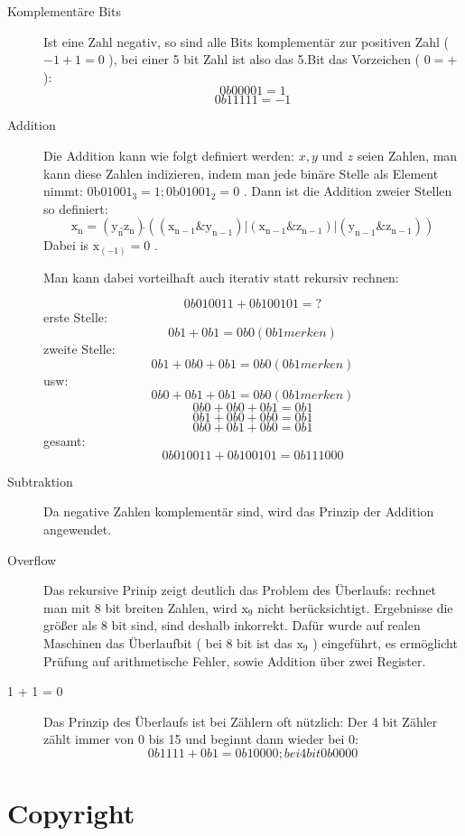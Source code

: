 \documentclass[a4paper,12pt,oneside]{scrreprt}
\begin{document}
\begin{description}

\item[Komplementäre Bits] Ist eine Zahl negativ, so sind alle Bits komplementär zur positiven Zahl ( $ -1 + 1 = 0 $  ), bei einer 5 bit Zahl ist also das 5.Bit das Vorzeichen ( $ 0 = + $):
	$$ 0b00001 = 1 $$
	$$ 0b11111 = -1 $$
	
\item[Addition] Die Addition kann wie folgt definiert werden: $ x, y $ und $ z $ seien Zahlen, man kann diese Zahlen indizieren, indem man jede binäre Stelle als Element nimmt: $ \mathrm{0b01001_{3}} = 1 ; \mathrm{0b01001_{2}} = 0 $ . Dann ist die Addition zweier Stellen so definiert:
	$$ \mathrm{x_n} = ( \mathrm{y_n} \hat{  } \mathrm{z_n} ) \hat{  } \mathrm{( ( x_{n-1} \& y_{n-1} ) | ( x_{n-1} \& z_{n-1} ) | ( y_{n-1} \& z_{n-1} ) ) } $$ 
Dabei is $ \mathrm{x_{(-1)}} = 0 $ .

Man kann dabei vorteilhaft auch iterativ statt rekursiv rechnen:

	$$ 0b010011 + 0b100101 = ? $$
	erste Stelle:
	$$ 0b1 + 0b1 = 0b0 ( 0b1 merken ) $$
	zweite Stelle:
	$$ 0b1 + 0b0 + 0b1 = 0b0 ( 0b1 merken) $$
	usw:
	$$ 0b0 + 0b1 + 0b1 = 0b0 ( 0b1 merken) $$
	$$ 0b0 + 0b0 + 0b1 = 0b1 $$
	$$ 0b1 + 0b0 + 0b0 = 0b1 $$
	$$ 0b0 + 0b1 + 0b0 = 0b1 $$
	gesamt:
	$$ 0b010011 + 0b100101 = 0b111000 $$

\item[Subtraktion] Da negative Zahlen komplementär sind, wird das Prinzip der Addition angewendet.

\item[Overflow] Das rekursive Prinip zeigt deutlich das Problem des Überlaufs: rechnet man mit 8 bit breiten Zahlen, wird $\mathrm{x_9} $ nicht berücksichtigt. Ergebnisse die größer als 8 bit sind, sind deshalb inkorrekt. Dafür wurde auf realen Maschinen das Überlaufbit ( bei 8 bit ist das $ \mathrm{x_9} $ ) eingeführt, es ermöglicht Prüfung auf arithmetische Fehler, sowie Addition über zwei Register.

\item[ 1 + 1 = 0 ] Das Prinzip des Überlaufs ist bei Zählern oft nützlich: Der 4 bit Zähler zählt immer von 0 bis 15 und beginnt dann wieder bei 0:
	$$ 0b1111 + 0b1 = 0b10000 ; bei 4 bit 0b0000 $$

\end{description}

\part{Copyright}
\end{document}
